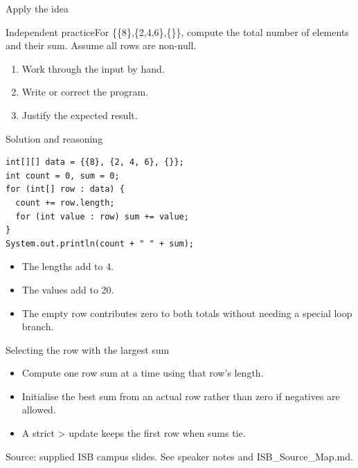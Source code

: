 \documentclass[10pt,aspectratio=169]{beamer}
\begin{document}
\begin{frame}[fragile,t]{Apply the idea}
\begin{alertblock}{Independent practice}For \{\{8\},\{2,4,6\},\{\}\}, compute the total number of elements and their sum. Assume all rows are non-null.\end{alertblock}\vspace{3mm}\begin{enumerate}\item Work through the input by hand.\item Write or correct the program.\item Justify the expected result.\end{enumerate}
\end{frame}

\begin{frame}[fragile,t]{Solution and reasoning}
\begin{lstlisting}
int[][] data = {{8}, {2, 4, 6}, {}};
int count = 0, sum = 0;
for (int[] row : data) {
  count += row.length;
  for (int value : row) sum += value;
}
System.out.println(count + " " + sum);
\end{lstlisting}\vspace{1mm}\small\begin{itemize}
\item The lengths add to 4.
\item The values add to 20.
\item The empty row contributes zero to both totals without needing a special loop branch.
\end{itemize}
\end{frame}

\begin{frame}[fragile,t]{Selecting the row with the largest sum}
\begin{itemize}
\item Compute one row sum at a time using that row's length.
\item Initialise the best sum from an actual row rather than zero if negatives are allowed.
\item A strict \textgreater{} update keeps the first row when sums tie.
\end{itemize}
\vspace{3mm}\footnotesize\textcolor{accent}{Source: supplied ISB campus slides. See speaker notes and ISB\_Source\_Map.md.}
\end{frame}
\end{document}
